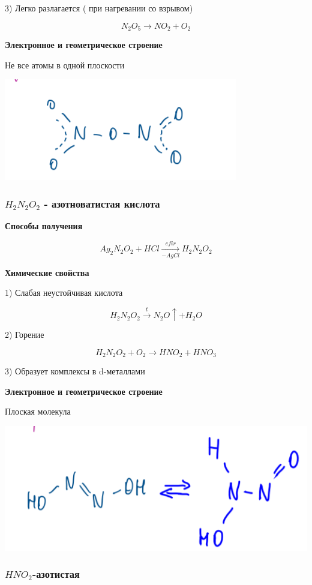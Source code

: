 3) Легко разлагается ( при нагревании со взрывом)

$$N_2O_5 \rightarrow NO_2 + O_2$$

\textbf{Электронное и геометрическое строение}

Не все атомы в одной плоскости

\includegraphics{images/8v11.png}

\subsubsection*{$H_2N_2O_2$ - азотноватистая кислота}

\textbf{Способы получения}

$$Ag_2N_2O_2 + HCl \xrightarrow[-AgCl]{efir} H_2N_2O_2$$

\textbf{Химические свойства}

1) Слабая неустойчивая кислота

$$H_2N_2O_2 \xrightarrow{t} N_2O \uparrow + H_2O$$

2) Горение

$$H_2N_2O_2 +O_2 \rightarrow HNO_2 + HNO_3$$

3) Образует комплексы в d-металлами

\textbf{Электронное и геометрическое строение}

Плоская молекула

\includegraphics{images/8v12.png}

\subsubsection*{$HNO_2$-азотистая}

